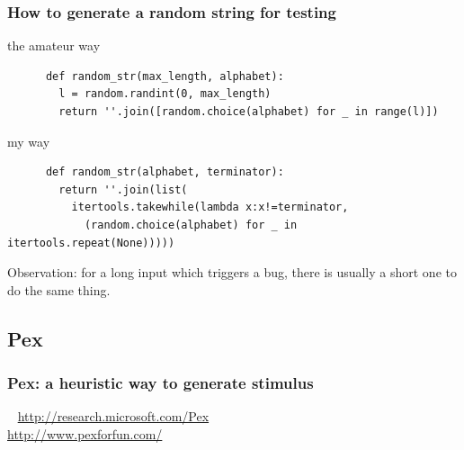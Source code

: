 \documentclass[lualatex]{beamer}
\begin{document}
\begin{frame}[fragile]
  \frametitle{How to generate a random string for testing}

  \begin{block}{the amateur way}
    \begin{verbatim}
      def random_str(max_length, alphabet):
        l = random.randint(0, max_length)
        return ''.join([random.choice(alphabet) for _ in range(l)])
    \end{verbatim}
  \end{block}
  \pause
  \begin{block}{my way}
    \begin{verbatim}
      def random_str(alphabet, terminator):
        return ''.join(list(
          itertools.takewhile(lambda x:x!=terminator,
            (random.choice(alphabet) for _ in itertools.repeat(None)))))
    \end{verbatim}
    Observation: for a long input which triggers a bug, there is usually a short one to do the same thing.
  \end{block}
\end{frame}

\subsection{Pex}

\begin{frame}
  \frametitle{Pex: a heuristic way to generate stimulus}

  \begin{block}{~}
    \url{http://research.microsoft.com/Pex}\\
    \url{http://www.pexforfun.com/}
  \end{block}
\end{frame}
\end{document}
